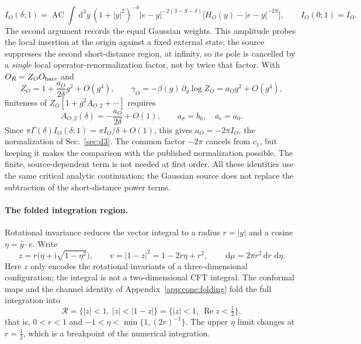 \documentclass[11pt,a4paper]{article}
\numberwithin{equation}{section}
\newcommand{\dd}{\,\mathrm d}
\newcommand{\AC}{\operatorname{AC}}
\begin{document}
\begin{equation}
 I_O(\delta;1)=\AC\!\int\dd^3y\,(1+|y|^2)^{-\delta}|e-y|^{-2(3-S-\delta)}\bigl[H_O(y)-|e-y|^{-2S}\bigr],
 \qquad I_O(0;1)=I_O .
 \label{eq:cone:Ireg}
\end{equation}
The second argument records the equal Gaussian weights. This amplitude probes the local insertion at the origin
against a fixed external state; the source suppresses the second short-distance region, at infinity, so its pole is
cancelled by a \emph{single} local operator-renormalization factor, not by twice that factor. With $O_R=Z_OO_{\rm bare}$
and
\begin{equation}
 Z_O=1+\frac{a_O}{2\delta}g^2+O(g^4),\qquad \gamma_O=-\beta(g)\,\partial_g\log Z_O=a_Og^2+O(g^4),
\end{equation}
finiteness of $Z_O[1+g^2A_{O,2}+\cdots]$ requires
\begin{equation}
 A_{O,2}(\delta)=-\frac{a_O}{2\delta}+O(1),\qquad a_\sigma=b_0,\quad a_\epsilon=a_0 .
\end{equation}
Since $\pi\Gamma(\delta)I_O(\delta;1)=\pi I_O/\delta+O(1)$, this gives $a_O=-2\pi I_O$, the normalization of
Sec.~\ref{sec:d3}. The common factor $-2\pi$ cancels from $c_1$, but keeping it makes the comparison with the
published normalization possible. The finite, source-dependent term is not needed at first order. All these identities
use the same critical analytic continuation; the Gaussian source does not replace the subtraction of the
short-distance power terms.

\paragraph{The folded integration region.} Rotational invariance reduces the vector integral to a radius $r=|y|$ and a
cosine $\eta=\widehat y\cdot e$. Write
\begin{equation}
 z=r\bigl(\eta+\mathrm i\sqrt{1-\eta^2}\bigr),\qquad v=|1-z|^2=1-2r\eta+r^2,\qquad \dd\mu=2\pi r^2\dd r\,\dd\eta .
\end{equation}
Here $z$ only encodes the rotational invariants of a three-dimensional configuration; the integral is not a
two-dimensional CFT integral. The conformal maps and the channel identity of Appendix~\ref{app:cone:folding} fold the full
integration into
\begin{equation}
 \mathcal R=\{|z|<1,\ |z|<|1-z|\}=\{|z|<1,\ \operatorname{Re}z<\tfrac12\},
 \label{eq:cone:region}
\end{equation}
that is, $0<r<1$ and $-1<\eta<\min\{1,(2r)^{-1}\}$. The upper $\eta$ limit changes at $r=\frac12$, which is a breakpoint
of the numerical integration.
\end{document}
